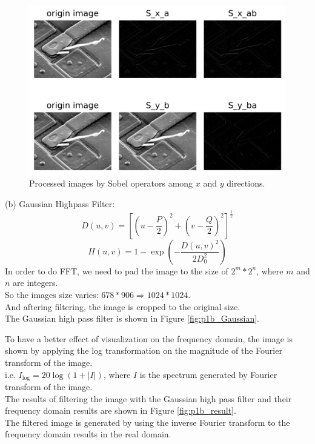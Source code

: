 \begin{figure}[htbp]
    \centering
	\includegraphics[width=\textwidth]{../images/p1/p1a.png}
    \caption{Processed images by Sobel operators among $x$ and $y$ directions.}
    \label{fig:p1a}
\end{figure}

(b)
Gaussian Highpass Filter:
$$D(u,v)=\left[\left(u-\dfrac{P}{2}\right)^2+\left(v-\dfrac{Q}{2}\right)^2\right]^\frac{1}{2}$$
$$H(u,v)=1-\exp\left(-\dfrac{D(u,v)^2}{2D_0^2}\right)$$
In order to do FFT, we need to pad the image to the size of $2^m*2^n$, where $m$ and $n$ are integers.\\
So the images size varies: $678*906\Rightarrow 1024*1024$.\\
And aftering filtering, the image is cropped to the original size.\\

The Gaussian high pass filter is shown in Figure \ref{fig:p1b_Gaussian}.

To have a better effect of visualization on the frequency domain, the image is shown by applying the log transformation on the magnitude of the Fourier transform of the image.\\
i.e. $I_{\text{log}}=20\log(1+|I|)$, where $I$ is the spectrum generated by Fourier transform of the image.\\
The results of filtering the image with the Gaussian high pass filter and their frequency domain results are shown in Figure \ref{fig:p1b_result}.\\
The filtered image is generated by using the inverse Fourier transform to the frequency domain results in the real domain.\\

